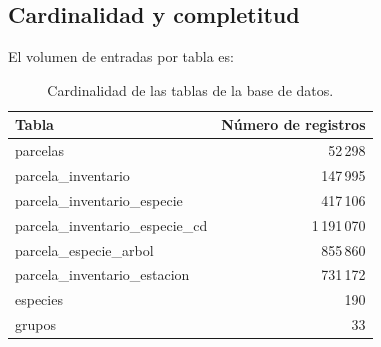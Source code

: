 \subsection{Cardinalidad y completitud}

El volumen de entradas por tabla es:
\begin{table}[htbp]
  \centering
  \caption{Cardinalidad de las tablas de la base de datos.}
  \label{tab:cardinalidad}
  \begin{tabular}{lr}
    \toprule
    \textbf{Tabla} & \textbf{N\'{u}mero de registros} \\
    \midrule
    parcelas & 52\,298 \\
    parcela\_inventario & 147\,995 \\
    parcela\_inventario\_especie & 417\,106 \\
    parcela\_inventario\_especie\_cd & 1\,191\,070 \\
    parcela\_especie\_arbol & 855\,860 \\
    parcela\_inventario\_estacion & 731\,172 \\
    especies & 190 \\
    grupos & 33 \\
    \bottomrule
  \end{tabular}
\end{table}
